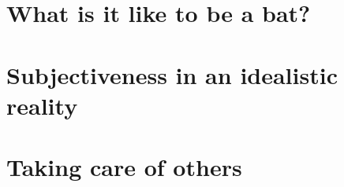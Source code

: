 \section{What is it like to be a bat?}

\section{Subjectiveness in an idealistic reality}

\section{Taking care of others}